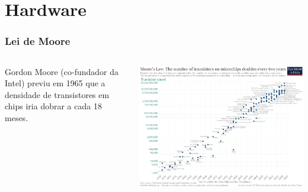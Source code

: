\documentclass[xcolor={usenames,dvipsnames},12pt,presentation,aspectratio=169]{beamer}
\begin{document}
\section{Hardware}
\begin{frame}
  \frametitle{Lei de Moore}
  \vspace{-3mm}
    \begin{columns}
      \begin{column}{0.3\textwidth}
        Gordon Moore (co-fundador da Intel) previu em 1965 que a densidade de transistores
        em chips iria dobrar a cada 18 meses.
     \end{column}
      \begin{column}{0.7\textwidth}
  \begin{center}
	\includegraphics[width=\textwidth]{moore.png}
  \end{center}
      \end{column}
    \end{columns}
\end{frame}
\end{document}
